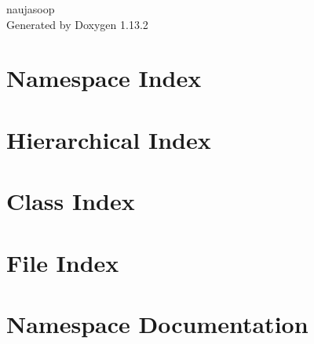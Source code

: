 \documentclass[twoside]{book}
\newcommand{\+}{\discretionary{\mbox{\scriptsize$\hookleftarrow$}}{}{}}
\newcommand{\clearemptydoublepage}{%
    \newpage{\pagestyle{empty}\cleardoublepage}%
  }
\begin{document}
  \raggedbottom
    \hypersetup{pageanchor=false,
                bookmarksnumbered=true,
                pdfencoding=unicode
               }
  \begin{titlepage}
  \vspace*{7cm}
  \begin{center}%
  {\Large naujasoop}\\
  \vspace*{1cm}
  {\large Generated by Doxygen 1.13.2}\\
  \end{center}
  \end{titlepage}
  \clearemptydoublepage
  \tableofcontents
  \clearemptydoublepage
  \hypersetup{pageanchor=true}

\chapter{Namespace Index}

\chapter{Hierarchical Index}

\chapter{Class Index}

\chapter{File Index}

\chapter{Namespace Documentation}














\end{document}
